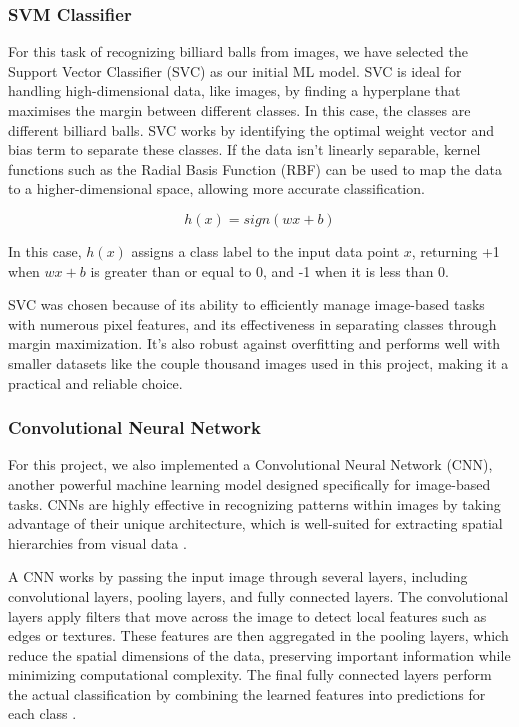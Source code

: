 \documentclass{article}
\begin{document}
\subsubsection*{SVM Classifier}
\label{sec:svm_classifier}
For this task of recognizing billiard balls from images, we have selected the Support Vector Classifier (SVC) as our initial ML model. SVC is ideal for handling high-dimensional data, like images, by finding a hyperplane that maximises the margin between different classes. In this case, the classes are different billiard balls. SVC works by identifying the optimal weight vector and bias term to separate these classes. If the data isn't linearly separable, kernel functions such as the Radial Basis Function (RBF) can be used to map the data to a higher-dimensional space, allowing more accurate classification. \cite{unknownMachineLearningApproach2023, nobleWhatSupportVector2006}

\begin{equation}
    h(x)=sign(wx+b)
\end{equation}

In this case, $h(x)$ assigns a class label  to the input data point $x$, returning +1 when $wx+b$ is greater than or equal to 0, and -1 when it is less than 0.

SVC was chosen because of its ability to efficiently manage image-based tasks with numerous pixel features, and its effectiveness in separating classes through margin maximization. It's also robust against overfitting and performs well with smaller datasets like the couple thousand images used in this project, making it a practical and reliable choice. \cite{unknownMachineLearningApproach2023,nobleWhatSupportVector2006}

\subsubsection*{Convolutional Neural Network}
\label{sec:convolutional_neural_network}
For this project, we also implemented a Convolutional Neural Network (CNN), another powerful machine learning model designed specifically for image-based tasks. CNNs are highly effective in recognizing patterns within images by taking advantage of their unique architecture, which is well-suited for extracting spatial hierarchies from visual data \cite{osheaIntroductionConvolutionalNeural2015}.

A CNN works by passing the input image through several layers, including convolutional layers, pooling layers, and fully connected layers. The convolutional layers apply filters that move across the image to detect local features such as edges or textures. These features are then aggregated in the pooling layers, which reduce the spatial dimensions of the data, preserving important information while minimizing computational complexity. The final fully connected layers perform the actual classification by combining the learned features into predictions for each class \cite{osheaIntroductionConvolutionalNeural2015}.
\end{document}
